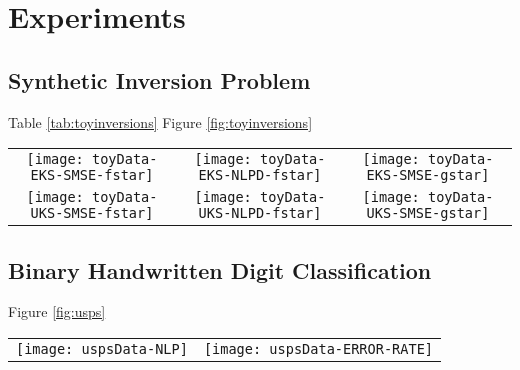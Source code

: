 \section{Experiments}
%
\subsection{Synthetic Inversion Problem}
%
Table \ref{tab:toyinversions}
Figure \ref{fig:toyinversions}
%
\begin{table*}[h]
\caption{Performance of the \eks and \uks methods compared to their GP counterparts (\egp and \ugp) on a range of synthetic benchmarks. 
\gp is the corresponds to the GP analytical solution in the linear case.
\label{tab:toyinversions}
}

\begin{center}

\end{center}
\end{table*}
%
\begin{figure*}
\centering
\begin{tabular}{c c c}
\texttt{[image: toyData-EKS-SMSE-fstar]} &
\texttt{[image: toyData-EKS-NLPD-fstar]} &
\texttt{[image: toyData-EKS-SMSE-gstar]} \\
\texttt{[image: toyData-UKS-SMSE-fstar]} &
\texttt{[image: toyData-UKS-NLPD-fstar]} &
\texttt{[image: toyData-UKS-SMSE-gstar]} \\
\end{tabular}
\caption{The performance of the \eks (top) and \uks (bottom)
on the synthetic inversion problems as a function of the number of features used. 
\label{fig:toyinversions}
}
\end{figure*}
%
\subsection{Binary Handwritten Digit Classification}
Figure \ref{fig:usps}

\begin{figure*}[h]
\centering
\begin{tabular}{c c}
\texttt{[image: uspsData-NLP]}  &
\texttt{[image: uspsData-ERROR-RATE]}  
\end{tabular}
\caption{The performance of the \eks and \uks (bottom) on the binary classification problem for the \usps dataset as a function of 
the number of  basis used. \egp and \ugp are the original (full) \gp models.
\label{fig:usps}
}
\end{figure*}
%
